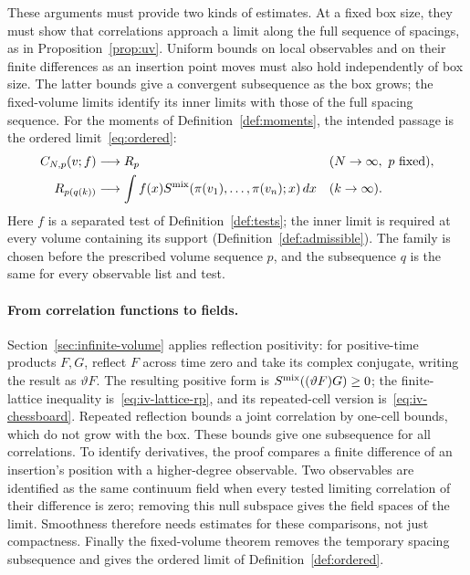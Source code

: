 These arguments must provide two kinds of estimates.
At a fixed box size, they must show that correlations approach a limit along the full sequence of spacings, as in Proposition~\ref{prop:uv}.
Uniform bounds on local observables and on their finite differences as an insertion point moves must also hold independently of box size.
The latter bounds give a convergent subsequence as the box grows; the fixed-volume limits identify its inner limits with those of the full spacing sequence.
For the moments of Definition~\ref{def:moments}, the intended passage is the ordered limit~\eqref{eq:ordered}:
\begin{equation*}
\begin{aligned}
 C_{N,p}(v;f)&\longrightarrow R_p &&(N\to\infty,\ p\text{ fixed}),\\
 R_{p(q(k))}&\longrightarrow\int f(x)S^{\mathrm{mix}}(\pi(v_1),\ldots,\pi(v_n);x)\,dx
 &&(k\to\infty).
\end{aligned}
\end{equation*}
Here $f$ is a separated test of Definition~\ref{def:tests}; the inner limit is required at every volume containing its support (Definition~\ref{def:admissible}).
The family is chosen before the prescribed volume sequence $p$, and the subsequence $q$ is the same for every observable list and test.

\paragraph{From correlation functions to fields.}
Section~\ref{sec:infinite-volume} applies reflection positivity: for positive-time products $F,G$, reflect $F$ across time zero and take its complex conjugate, writing the result as $\vartheta F$.
The resulting positive form is $S^{\mathrm{mix}}((\vartheta F)G)\ge0$; the finite-lattice inequality is~\eqref{eq:iv-lattice-rp}, and its repeated-cell version is~\eqref{eq:iv-chessboard}.
Repeated reflection bounds a joint correlation by one-cell bounds, which do not grow with the box.
These bounds give one subsequence for all correlations.
To identify derivatives, the proof compares a finite difference of an insertion's position with a higher-degree observable.
Two observables are identified as the same continuum field when every tested limiting correlation of their difference is zero; removing this null subspace gives the field spaces of the limit.
Smoothness therefore needs estimates for these comparisons, not just compactness.
Finally the fixed-volume theorem removes the temporary spacing subsequence and gives the ordered limit of Definition~\ref{def:ordered}.

